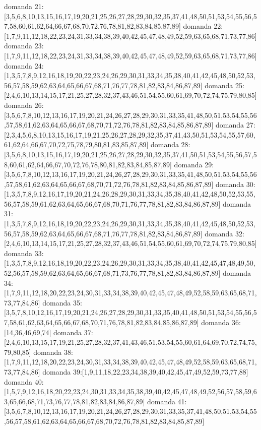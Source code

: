 domanda 21:[3,5,6,8,10,13,15,16,17,19,20,21,25,26,27,28,29,30,32,35,37,41,48,50,51,53,54,55,56,57,58,60,61,62,64,66,67,68,70,72,76,78,81,82,83,84,85,87,89]
domanda 22:[1,7,9,11,12,18,22,23,24,31,33,34,38,39,40,42,45,47,48,49,52,59,63,65,68,71,73,77,86]
domanda 23:[1,7,9,11,12,18,22,23,24,31,33,34,38,39,40,42,45,47,48,49,52,59,63,65,68,71,73,77,86]
domanda 24:[1,3,5,7,8,9,12,16,18,19,20,22,23,24,26,29,30,31,33,34,35,38,40,41,42,45,48,50,52,53,56,57,58,59,62,63,64,65,66,67,68,71,76,77,78,81,82,83,84,86,87,89]
domanda 25:[2,4,6,10,13,14,15,17,21,25,27,28,32,37,43,46,51,54,55,60,61,69,70,72,74,75,79,80,85]
domanda 26:[3,5,6,7,8,10,12,13,16,17,19,20,21,24,26,27,28,29,30,31,33,35,41,48,50,51,53,54,55,56,57,58,61,62,63,64,65,66,67,68,70,71,72,76,78,81,82,83,84,85,86,87,89]
domanda 27:[2,3,4,5,6,8,10,13,15,16,17,19,21,25,26,27,28,29,32,35,37,41,43,50,51,53,54,55,57,60,61,62,64,66,67,70,72,75,78,79,80,81,83,85,87,89]
domanda 28:[3,5,6,8,10,13,15,16,17,19,20,21,25,26,27,28,29,30,32,35,37,41,50,51,53,54,55,56,57,58,60,61,62,64,66,67,70,72,76,78,80,81,82,83,84,85,87,89]
domanda 29:[3,5,6,7,8,10,12,13,16,17,19,20,21,24,26,27,28,29,30,31,33,35,41,48,50,51,53,54,55,56,57,58,61,62,63,64,65,66,67,68,70,71,72,76,78,81,82,83,84,85,86,87,89]
domanda 30:[1,3,5,7,8,9,12,16,17,19,20,21,24,26,28,29,30,31,33,34,35,38,40,41,42,48,50,52,53,55,56,57,58,59,61,62,63,64,65,66,67,68,70,71,76,77,78,81,82,83,84,86,87,89]
domanda 31:[1,3,5,7,8,9,12,16,18,19,20,22,23,24,26,29,30,31,33,34,35,38,40,41,42,45,48,50,52,53,56,57,58,59,62,63,64,65,66,67,68,71,76,77,78,81,82,83,84,86,87,89]
domanda 32:[2,4,6,10,13,14,15,17,21,25,27,28,32,37,43,46,51,54,55,60,61,69,70,72,74,75,79,80,85]
domanda 33:[1,3,5,7,8,9,12,16,18,19,20,22,23,24,26,29,30,31,33,34,35,38,40,41,42,45,47,48,49,50,52,56,57,58,59,62,63,64,65,66,67,68,71,73,76,77,78,81,82,83,84,86,87,89]
domanda 34:[1,7,9,11,12,18,20,22,23,24,30,31,33,34,38,39,40,42,45,47,48,49,52,58,59,63,65,68,71,73,77,84,86]
domanda 35:[3,5,7,8,10,12,16,17,19,20,21,24,26,27,28,29,30,31,33,35,40,41,48,50,51,53,54,55,56,57,58,61,62,63,64,65,66,67,68,70,71,76,78,81,82,83,84,85,86,87,89]
domanda 36:[14,36,46,69,74]
domanda 37:[2,4,6,10,13,15,17,19,21,25,27,28,32,37,41,43,46,51,53,54,55,60,61,64,69,70,72,74,75,79,80,85]
domanda 38:[1,7,9,11,12,18,20,22,23,24,30,31,33,34,38,39,40,42,45,47,48,49,52,58,59,63,65,68,71,73,77,84,86]
domanda 39:[1,9,11,18,22,23,34,38,39,40,42,45,47,49,52,59,73,77,88]
domanda 40:[1,5,7,9,12,16,18,20,22,23,24,30,31,33,34,35,38,39,40,42,45,47,48,49,52,56,57,58,59,63,65,66,68,71,73,76,77,78,81,82,83,84,86,87,89]
domanda 41:[3,5,6,7,8,10,12,13,16,17,19,20,21,24,26,27,28,29,30,31,33,35,37,41,48,50,51,53,54,55,56,57,58,61,62,63,64,65,66,67,68,70,72,76,78,81,82,83,84,85,87,89]

